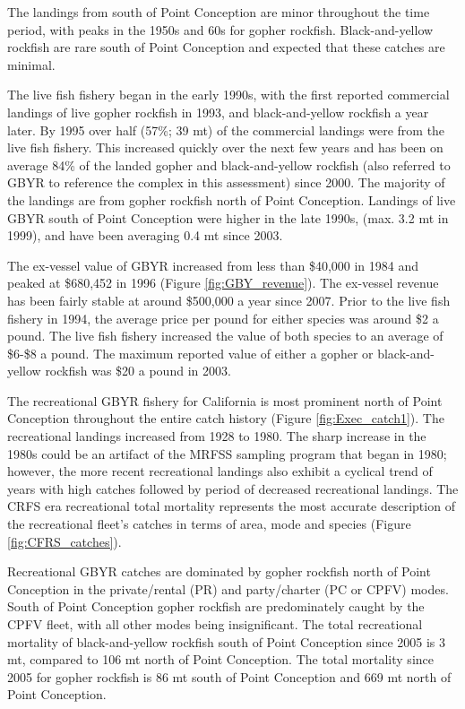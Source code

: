 \documentclass[12pt,]{article}
\begin{document}
The landings from south of Point Conception are minor throughout the
time period, with peaks in the 1950s and 60s for gopher rockfish.
Black-and-yellow rockfish are rare south of Point Conception and
expected that these catches are minimal.

The live fish fishery began in the early 1990s, with the first reported
commercial landings of live gopher rockfish in 1993, and
black-and-yellow rockfish a year later. By 1995 over half (57\%; 39 mt)
of the commercial landings were from the live fish fishery. This
increased quickly over the next few years and has been on average 84\%
of the landed gopher and black-and-yellow rockfish (also referred to
GBYR to reference the complex in this assessment) since 2000. The
majority of the landings are from gopher rockfish north of Point
Conception. Landings of live GBYR south of Point Conception were higher
in the late 1990s, (max. 3.2 mt in 1999), and have been averaging 0.4 mt
since 2003.

The ex-vessel value of GBYR increased from less than \$40,000 in 1984
and peaked at \$680,452 in 1996 (Figure \ref{fig:GBY_revenue}). The
ex-vessel revenue has been fairly stable at around \$500,000 a year
since 2007. Prior to the live fish fishery in 1994, the average price
per pound for either species was around \$2 a pound. The live fish
fishery increased the value of both species to an average of \$6-\$8 a
pound. The maximum reported value of either a gopher or black-and-yellow
rockfish was \$20 a pound in 2003.

The recreational GBYR fishery for California is most prominent north of
Point Conception throughout the entire catch history (Figure
\ref{fig:Exec_catch1}). The recreational landings increased from 1928 to
1980. The sharp increase in the 1980s could be an artifact of the MRFSS
sampling program that began in 1980; however, the more recent
recreational landings also exhibit a cyclical trend of years with high
catches followed by period of decreased recreational landings. The CRFS
era recreational total mortality represents the most accurate
description of the recreational fleet's catches in terms of area, mode
and species (Figure \ref{fig:CFRS_catches}).

Recreational GBYR catches are dominated by gopher rockfish north of
Point Conception in the private/rental (PR) and party/charter (PC or
CPFV) modes. South of Point Conception gopher rockfish are predominately
caught by the CPFV fleet, with all other modes being insignificant. The
total recreational mortality of black-and-yellow rockfish south of Point
Conception since 2005 is 3 mt, compared to 106 mt north of Point
Conception. The total mortality since 2005 for gopher rockfish is 86 mt
south of Point Conception and 669 mt north of Point Conception.
\end{document}
